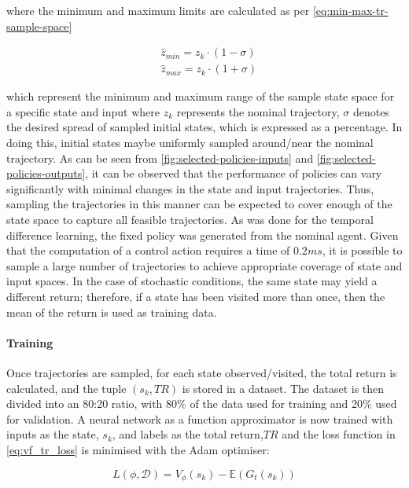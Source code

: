 where the minimum and maximum limits are calculated as per \autoref{eq:min-max-tr-sample-space}

\begin{equation}\label{eq:min-max-tr-sample-space}
\begin{aligned}
    &\hat{z}_{min} = z_k \cdot (1-\sigma)\\
    &\hat{z}_{max} = z_k \cdot (1+\sigma)
\end{aligned}
\end{equation}

which represent the minimum and maximum range of the sample state space for a specific state and input where ${z}_{k}$ represents the nominal trajectory, $\sigma$ denotes the desired spread of sampled initial states, which is expressed as a percentage. In doing this, initial states maybe uniformly sampled around/near the nominal trajectory. As can be seen from \autoref{fig:selected-policies-inputs} and \autoref{fig:selected-policies-outputs}, it can be observed that the performance of policies can vary significantly with minimal changes in the state and input trajectories. Thus, sampling the trajectories in this manner can be expected to cover enough of the state space to capture all feasible trajectories. As was done for the temporal difference learning, the fixed policy was generated from the nominal agent. Given that the computation of a control action requires a time of $0.2 ms$, it is possible to sample a large number of trajectories to achieve appropriate coverage of state and input spaces. In the case of stochastic conditions, the same state may yield a different return; therefore, if a state has been visited more than once, then the mean of the return is used as training data.

\paragraph{Training}
Once trajectories are sampled, for each state observed/visited, the total return is calculated, and the tuple $(s_k,TR)$ is stored in a dataset. The dataset is then divided into an 80:20 ratio, with 80\% of the data used for training and 20\% used for validation. A neural network as a function approximator is now trained with inputs as the state, $s_k$, and labels as the total return,$TR$ and the loss function in \autoref{eq:vf_tr_loss} is minimised with the Adam optimiser:

\begin{equation}\label{eq:vf_tr_loss}
    L(\phi, \mathcal{D}) =   V_{\phi}(s_k) - \mathbb{E}(G_t(s_k))
\end{equation}

